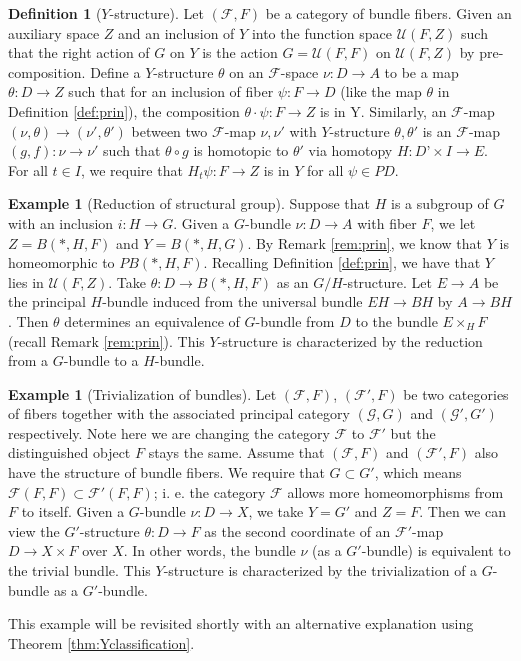 \documentclass[psamsfonts]{amsart}
\theoremstyle{definition}
\newtheorem{defn}[thm]{Definition}
\newtheorem{exmp}[thm]{Example}
\theoremstyle{remark}
\numberwithin{equation}{section}
\begin{document}
\begin{defn}[$Y$-structure]
\label{def:Y}
Let $(\mathcal{F}, F)$ be a category of bundle fibers. Given an auxiliary space $Z$ and an inclusion of $Y$ into the function space $\mathcal{U}(F, Z)$ such that the right action of $G$ on $Y$ is the action $G = \mathcal{U}(F, F)$ on $\mathcal{U}(F, Z)$ by pre-composition. Define a $Y$-structure $\theta$ on an $\mathcal{F}$-space $\nu: D \rightarrow A$ to be a map $\theta: D \rightarrow Z$ such that for an inclusion of fiber $\psi: F \rightarrow D$ (like the map $\theta$ in Definition \ref{def:prin}), the composition $\theta\cdot\psi: F \rightarrow Z$ is in Y. Similarly, an $\mathcal{F}$-map $(\nu, \theta) \rightarrow (\nu', \theta')$ between two $\mathcal{F}$-map $\nu, \nu'$ with $Y$-structure $\theta, \theta'$ is an $\mathcal{F}$-map $(g, f): \nu \rightarrow \nu'$ such that $\theta \circ g$ is homotopic to $\theta'$ via homotopy $H: D’ \times I \rightarrow E$. For all $t \in I$, we require that $H_{t}\psi: F \rightarrow Z$ is in $Y$ for all $\psi \in PD$.
\end{defn} 

\begin{exmp} [Reduction of structural group]
Suppose that $H$ is a subgroup of $G$ with an inclusion $i: H \to G$. Given a $G$-bundle $\nu: D \to A$ with fiber $F$, we let $Z = B(*, H, F)$ and $Y = B(*, H, G)$. By Remark \ref{rem:prin}, we know that $Y$ is homeomorphic to $PB(*, H, F)$. Recalling Definition \ref{def:prin}, we have that $Y$ lies in $\mathcal{U}(F, Z)$. Take $\theta: D \to B(*, H, F)$ as an $G/H$-structure. Let $E \to A$ be the principal $H$-bundle induced from the universal bundle $EH \to BH$ by $A \to BH$. Then $\theta$ determines an equivalence of $G$-bundle from $D$ to the bundle $E \times_{H}F$ (recall Remark \ref{rem:prin}). This $Y$-structure is characterized by the reduction from a $G$-bundle to a $H$-bundle.
\end{exmp}

\begin{exmp} [Trivialization of bundles] 
\label{exp:trivialization}
Let $(\mathcal{F}, F)$, $(\mathcal{F'}, F)$ be two categories of fibers together with the associated principal category $(\mathcal{G}, G)$ and $(\mathcal{G}', G')$ respectively. Note here we are changing the category $\mathcal{F}$ to $\mathcal{F}'$ but the distinguished object $F$ stays the same. Assume that $(\mathcal{F}, F)$ and $(\mathcal{F'}, F)$ also have the structure of bundle fibers. We require that $G \subset G'$, which means $\mathcal{F}(F, F) \subset \mathcal{F}'(F, F)$; i. e. the category $\mathcal{F}$ allows more homeomorphisms from $F$ to itself. Given a $G$-bundle $\nu: D \to X$, we take $Y = G'$ and $Z = F$. Then we can view the $G'$-structure $\theta: D \to F$ as the second coordinate of an $\mathcal{F'}$-map $D \to X \times F$ over $X$. In other words, the bundle $\nu$ (as a $G'$-bundle) is equivalent to the trivial bundle. This $Y$-structure is characterized by the trivialization of a $G$-bundle as a $G'$-bundle.

This example will be revisited shortly with an alternative explanation using Theorem \ref{thm:Yclassification}.
\end{exmp}
\end{document}

